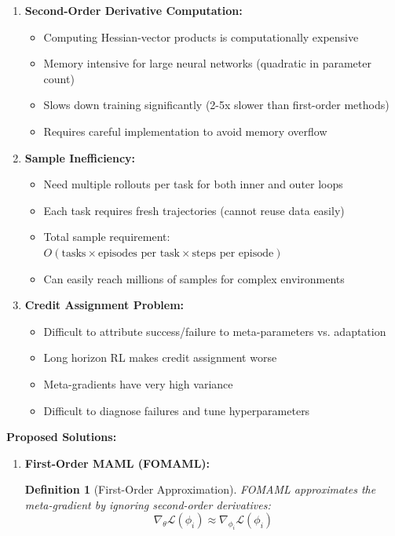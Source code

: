 \documentclass[12pt]{article}
\newcommand{\ieee}[1]{\textcolor{IEEEBlue}{\textbf{#1}}}
\newtheorem{definition}{Definition}
\begin{document}
{{\begin{enumerate}
				\item \textbf{Second-Order Derivative Computation:}
				\begin{itemize}
					\item Computing Hessian-vector products is computationally expensive
					\item Memory intensive for large neural networks (quadratic in parameter count)
					\item Slows down training significantly (2-5x slower than first-order methods)
					\item Requires careful implementation to avoid memory overflow
				\end{itemize}
				
				\item \textbf{Sample Inefficiency:}
				\begin{itemize}
					\item Need multiple rollouts per task for both inner and outer loops
					\item Each task requires fresh trajectories (cannot reuse data easily)
					\item Total sample requirement: $O(\text{tasks} \times \text{episodes per task} \times \text{steps per episode})$
					\item Can easily reach millions of samples for complex environments
				\end{itemize}
				
				\item \textbf{Credit Assignment Problem:}
				\begin{itemize}
					\item Difficult to attribute success/failure to meta-parameters vs. adaptation
					\item Long horizon RL makes credit assignment worse
					\item Meta-gradients have very high variance
					\item Difficult to diagnose failures and tune hyperparameters
				\end{itemize}
			\end{enumerate}
			
			\ieee{Proposed Solutions:}
			
			\begin{enumerate}
				\item \textbf{First-Order MAML (FOMAML):}
				
				\begin{definition}[First-Order Approximation]
				FOMAML approximates the meta-gradient by ignoring second-order derivatives:
				\begin{equation}
				\nabla_\theta \mathcal{L}(\phi_i) \approx \nabla_{\phi_i} \mathcal{L}(\phi_i)
				\end{equation}
				\end{definition}
				

\end{enumerate}}}
\end{document}
